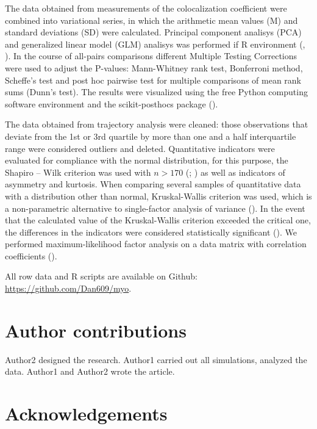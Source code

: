 \documentclass[alpha-refs]{wiley-article}
\begin{document}
The data obtained from measurements of the colocalization coefficient were combined into variational series, in which the arithmetic mean values (M) and standard deviations (SD) were calculated.
Principal component analisys (PCA)  and generalized linear model (GLM) analisys was performed if R environment (\cite{husson2010exploratory}, \cite{dobson2008introduction}).
In the course of all-pairs comparisons different Multiple Testing Corrections were used to adjust the P-values: Mann-Whitney rank test, Bonferroni method, Scheffe’s test and post hoc pairwise test for multiple comparisons of mean rank sums (Dunn’s test).
The results were visualized using the free Python computing software environment and the scikit-posthocs package (\cite{Terpilowski2019}).


The data obtained from trajectory analysis were cleaned: those observations that deviate from the 1st or 3rd quartile by more than one and a half interquartile range were considered outliers and deleted.
Quantitative indicators were evaluated for compliance with the normal distribution, for this purpose, the Shapiro – Wilk criterion  was used with $n > 170$ (\cite{shapiro1965analysis}; \cite{shapiro1972approximate}) as well as indicators of asymmetry and kurtosis.
When comparing several samples of quantitative data with a distribution other than normal, Kruskal-Wallis criterion was used, which is a non-parametric alternative to single-factor analysis of variance (\cite{kruskal1952use}).
In the event that the calculated value of the Kruskal-Wallis criterion exceeded the critical one, the differences in the indicators were considered statistically significant (\cite{wilcoxon1992individual}).
We performed maximum-likelihood factor analysis on a data matrix with correlation coefficients (\cite{lawley1971factor}).

All row data and R scripts are available on Github: \url{https://github.com/Dan609/myo}.


\section*{Author contributions}

Author2 designed the research. Author1 carried out all simulations, analyzed the data. Author1 and Author2 wrote the article.

\section*{Acknowledgements}
\end{document}
